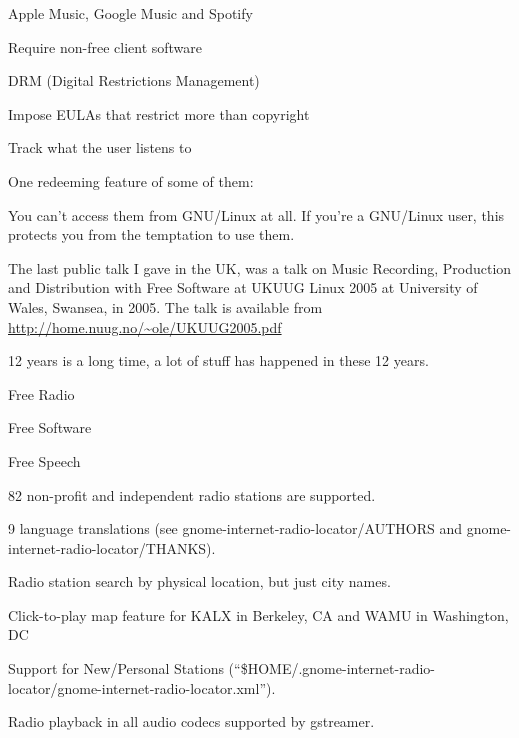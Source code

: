 \documentclass[20pt,landscape]{foils}
\begin{document}

\begin{list1}
\item Apple Music, Google Music and Spotify
  \begin{list2}
  \item Require non-free client software
  \item DRM (Digital Restrictions Management)
  \item Impose EULAs that restrict more than copyright
  \item Track what the user listens to
  \end{list2}
\end{list1}

One redeeming feature of some of them:

\begin{list2}
\item You can't access them from GNU/Linux at all.  If you're a GNU/Linux user, this protects you from the temptation to use them.
\end{list2}


The last public talk I gave in the UK, was a talk on Music Recording, Production and Distribution with Free Software at UKUUG Linux 2005 at University of Wales, Swansea, in 2005. The talk is available from \url{http://home.nuug.no/~ole/UKUUG2005.pdf}

12 years is a long time, a lot of stuff has happened in these 12 years.

\begin{list1}
\item Free Radio
\item Free Software
\item Free Speech
\end{list1}


\begin{list1}
\item 82 non-profit and independent radio stations are supported.
\item 9 language translations (see gnome-internet-radio-locator/AUTHORS and gnome-internet-radio-locator/THANKS).
\item Radio station search by physical location, but just city names.
\item Click-to-play map feature for KALX in Berkeley, CA and WAMU in Washington, DC
\item Support for New/Personal Stations (``\$HOME/.gnome-internet-radio-locator/gnome-internet-radio-locator.xml'').
\item Radio playback in all audio codecs supported by gstreamer.
\end{list1}
\end{document}
